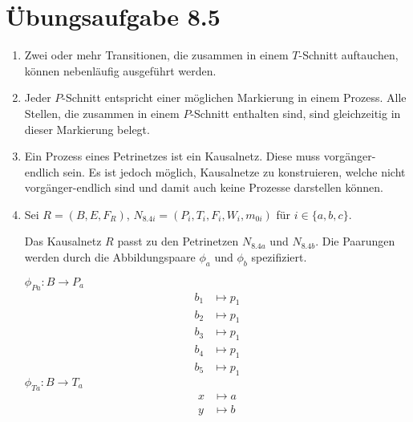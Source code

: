 \documentclass[a4paper]{scrartcl}
\begin{document}
\section*{Übungsaufgabe 8.5} 
\begin{enumerate}
    \item
        Zwei oder mehr Transitionen, die zusammen in einem $T$-Schnitt
        auftauchen, können nebenläufig ausgeführt werden.

    \item
        Jeder $P$-Schnitt entspricht einer möglichen Markierung in einem
        Prozess.
        Alle Stellen, die zusammen in einem $P$-Schnitt enthalten sind,
        sind gleichzeitig in dieser Markierung belegt.

    \item
        Ein Prozess eines Petrinetzes ist ein Kausalnetz.
        Diese muss vorgänger-endlich sein.
        Es ist jedoch möglich, Kausalnetze zu konstruieren, welche nicht
        vorgänger-endlich sind und damit auch keine Prozesse darstellen können.

    \item
        Sei $R = (B,E,F_R)$, $N_{8.4i} = (P_i,T_i,F_i,W_i,m_{0i})$ für
        $i \in \{ a,b,c \}$.

        Das Kausalnetz $R$ passt zu den Petrinetzen $N_{8.4a}$ und $N_{8.4b}$.
        Die Paarungen werden durch die Abbildungspaare $\phi_a$ und $\phi_b$
        spezifiziert.

        $\phi_{Pa} \colon B \to P_a$
        \begin{equation}
            \begin{split}
                b_1 &\mapsto p_1 \\
                b_2 &\mapsto p_1 \\
                b_3 &\mapsto p_1 \\
                b_4 &\mapsto p_1 \\
                b_5 &\mapsto p_1
            \end{split}
        \end{equation}
        $\phi_{Ta} \colon B \to T_a$
        \begin{equation}
            \begin{split}
                x &\mapsto a \\
                y &\mapsto b
            \end{split}
        \end{equation}


\end{enumerate}
\end{document}

